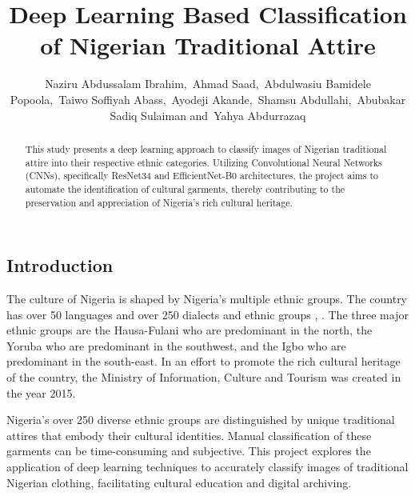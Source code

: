 \documentclass[
  journal,
]{IEEEtran}%
\title{Deep Learning Based Classification of Nigerian Traditional
Attire}
\author{
Naziru Abdussalam Ibrahim,~Ahmad Saad,~Abdulwasiu Bamidele
Popoola,~Taiwo Soffiyah Abass,~Ayodeji Akande,~Shamsu
Abdullahi,~Abubakar Sadiq Sulaiman
and~Yahya Abdurrazaq%
}
\begin{document}


\maketitle

\begin{abstract}
This study presents a deep learning approach to classify images of
Nigerian traditional attire into their respective ethnic categories.
Utilizing Convolutional Neural Networks (CNNs), specifically ResNet34
and EfficientNet-B0 architectures, the project aims to automate the
identification of cultural garments, thereby contributing to the
preservation and appreciation of Nigeria's rich cultural heritage.
\end{abstract}

%


\subsection{Introduction}\label{introduction}

The culture of Nigeria is shaped by Nigeria's multiple ethnic groups.
The country has over 50 languages and over 250 dialects and ethnic
groups ,
. The three major ethnic groups are the Hausa-Fulani who are predominant
in the north, the Yoruba who are predominant in the southwest, and the
Igbo who are predominant in the south-east. In an effort to promote the
rich cultural heritage of the country, the Ministry of Information,
Culture and Tourism was created in the year 2015.

Nigeria's over 250 diverse ethnic groups are distinguished by unique
traditional attires that embody their cultural identities. Manual
classification of these garments can be time-consuming and subjective.
This project explores the application of deep learning techniques to
accurately classify images of traditional Nigerian clothing,
facilitating cultural education and digital archiving.
\end{document}
